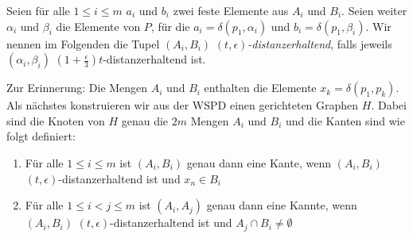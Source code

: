    Seien für alle $1 \leq i \leq m$ $a_i$ und $b_i$ zwei feste Elemente aus $A_i$ und $B_i$. Seien weiter $\alpha_i$ und $\beta_i$ die Elemente von $P$, für die $a_i = \delta(p_1, \alpha_i)$ und $b_i = \delta(p_1, \beta_i)$. Wir nennen im Folgenden die Tupel $(A_i, B_i)$ \emph{$(t, \epsilon)$-distanzerhaltend}, falls jeweils $(\alpha_i, \beta_i)$ $(1 + \frac{\epsilon }{3})t$-distanzerhaltend ist.
    
    Zur Erinnerung: Die Mengen $A_i$ und $B_i$ enthalten die Elemente $x_k = \delta(p_1, p_k)$.
    Als nächstes konstruieren wir aus der WSPD einen gerichteten Graphen $H$. Dabei sind die Knoten von $H$ genau die $2m$ Mengen $A_i$ und $B_i$ und die Kanten sind wie folgt definiert:
    \begin{enumerate}
    	\item Für alle $1 \leq i \leq m$ ist $(A_i, B_i)$ genau dann eine Kante, wenn $(A_i, B_i)$ $(t, \epsilon)$-distanzerhaltend ist und $x_n \in B_i$
    	\item Für alle $1\leq i < j \leq m$ ist $(A_i, A_j)$ genau dann eine Kannte, wenn $(A_i, B_i)$ $(t, \epsilon)$-distanzerhaltend ist und $A_j \cap B_i \neq \emptyset$
    \end{enumerate}

